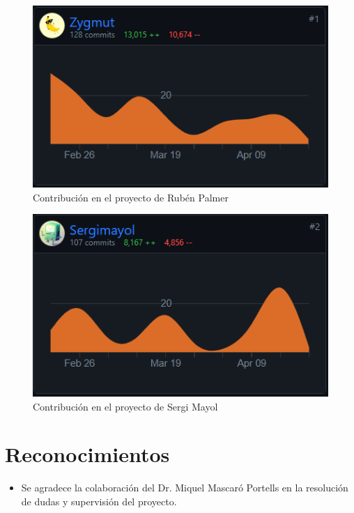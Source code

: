 \documentclass[12pt,journal,compsoc]{IEEEtran}
\begin{document}
\begin{figure}[!h]
    \centering
    \includegraphics[width=\linewidth]{ruben.png}
    \caption{Contribución en el proyecto de Rubén Palmer}
    \label{fig:contrib_ruben}
\end{figure}

\begin{figure}[!h]
    \centering
    \includegraphics[width=\linewidth]{sergi.png}
    \caption{Contribución en el proyecto de Sergi Mayol}
    \label{fig:contrib_sergi}
\end{figure}

\newpage

\section*{Reconocimientos}
\begin{itemize}
    \item Se agradece la colaboración del Dr. Miquel Mascaró Portells en la resolución de dudas y supervisión del proyecto.
\end{itemize}
\end{document}

